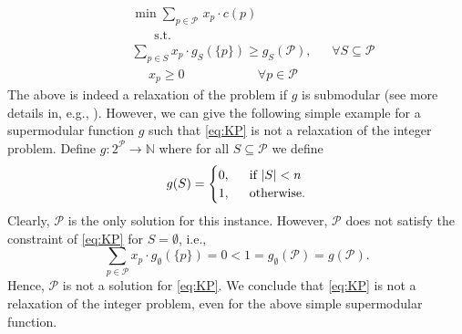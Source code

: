 \documentclass[11pt]{article}
\newcommand{\cP}{{\mathcal{P}}}
\begin{document}
{\begin{equation}
	\label{eq:KP}
	\begin{aligned}
	~~~~~~~~	& \min \sum_{p \in \cP~}  x_p \cdot c(p)\\
		& ~~~~~~~~\text{s.t. }\\
		& \sum_{p \in S} x_p \cdot g_S(\{p\}) \geq g_S(\cP), 	~~~~~~~\forall S  \subseteq \cP\\ 
		& ~~~~~~x_p \geq 0 ~~~~~~~~~~~~~~~~~~~~~~~~~~	\forall p \in \cP
	\end{aligned}
\end{equation} The above is indeed a relaxation of the problem if $g$ is submodular (see more details in, e.g., \cite{gupta2020online}). However, we can give the following simple example for a supermodular function $g$  such that \eqref{eq:KP} is not a relaxation of the integer problem. Define $g:2^{\cP} \rightarrow \mathbb{N}$ where for all $S \subseteq \cP$ we define
$$g(S) = \begin{cases}
	0, & ~~\textnormal{if } |S| < n \\
	1, & ~~\textnormal{otherwise}. %
\end{cases}$$
Clearly, $\cP$ is the only solution for this instance. However, $\cP$ does not satisfy the constraint of \eqref{eq:KP} for $S = \emptyset$, i.e.,  $$\sum_{p \in \cP} x_p \cdot g_{\emptyset}(\{p\}) = 0 < 1  = g_{\emptyset}(\cP) = g(\cP).$$
Hence, $\cP$ is not a solution for \eqref{eq:KP}. We conclude that \eqref{eq:KP} is not a relaxation of the integer problem, even for the above simple supermodular function. 





}





















\end{document}
